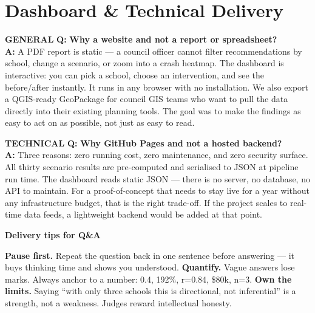 \documentclass[10pt,a4paper]{extarticle}
\newcommand{\qa}[4]{%
  \begin{mdframed}[
    backgroundcolor=PG,
    linecolor=MG,
    linewidth=1.2pt,
    leftline=true, rightline=false, topline=false, bottomline=false,
    innerleftmargin=10pt, innerrightmargin=8pt,
    innertopmargin=6pt, innerbottommargin=7pt,
    skipabove=5pt, skipbelow=2pt
  ]
  \noindent
  \colorbox{#2}{\tiny\color{white}\textbf{#1}}\hspace{4pt}%
  {\bfseries\color{DG} Q:} {\bfseries\color{INK}#3}\\[3pt]
  {\bfseries\color{MG} A:} {\color{SLT}#4}
  \end{mdframed}%
}
\begin{document}
\section{Dashboard \& Technical Delivery}

\qa{GENERAL}{TEA}
{Why a website and not a report or spreadsheet?}
{A PDF report is static --- a council officer cannot filter recommendations by school, change a scenario, or zoom into a crash heatmap. The dashboard is interactive: you can pick a school, choose an intervention, and see the before/after instantly. It runs in any browser with no installation. We also export a QGIS-ready GeoPackage for council GIS teams who want to pull the data directly into their existing planning tools. The goal was to make the findings as easy to act on as possible, not just as easy to read.}

\qa{TECHNICAL}{MG}
{Why GitHub Pages and not a hosted backend?}
{Three reasons: zero running cost, zero maintenance, and zero security surface. All thirty scenario results are pre-computed and serialised to JSON at pipeline run time. The dashboard reads static JSON --- there is no server, no database, no API to maintain. For a proof-of-concept that needs to stay live for a year without any infrastructure budget, that is the right trade-off. If the project scales to real-time data feeds, a lightweight backend would be added at that point.}

\vspace{8pt}

\colorbox{SLT}{\parbox{\linewidth}{%
  \vspace{5pt}\hspace{8pt}%
  {\color{white}\bfseries\small Delivery tips for Q\&A}
  \vspace{3pt}
}}
\colorbox{SLT!15}{\parbox{\linewidth}{%
  \vspace{4pt}\hspace{8pt}%
  {\color{SLT}\small
  \textbf{Pause first.} Repeat the question back in one sentence before answering --- it buys thinking time and shows you understood. \quad
  \textbf{Quantify.} Vague answers lose marks. Always anchor to a number: 0.4, 192\%, r=0.84, \$80k, n=3. \quad
  \textbf{Own the limits.} Saying ``with only three schools this is directional, not inferential'' is a strength, not a weakness. Judges reward intellectual honesty.
  }
  \vspace{4pt}
}}
\end{document}
